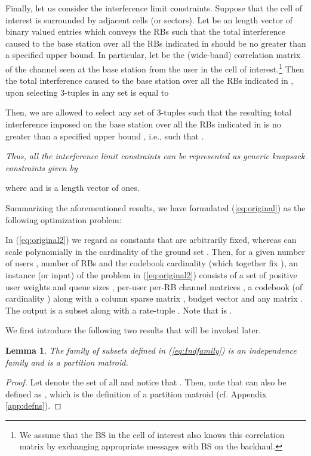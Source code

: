 \documentclass[11pt] {article}
\newtheorem{lemma}{Lemma}
\begin{document}
 Finally, let us consider the interference limit constraints. Suppose that the cell of interest is surrounded by  adjacent cells (or sectors). Let  be an length vector of binary valued entries which conveys the RBs such that the total interference caused to the  base station over all the RBs indicated in  should be no greater than a specified upper bound. In particular,
  let  be the (wide-band) correlation matrix of the channel seen at the  base station from the  user in the cell of interest.\footnote{We assume that the BS in the cell of interest also knows this correlation matrix by exchanging appropriate messages with BS  on the backhaul.} Then the total interference caused to the  base station over all the RBs indicated in , upon selecting 3-tuples in any set  is equal to
   
  Then, we are allowed to select   any set of 3-tuples  such that the resulting total interference imposed on the  base station over all the RBs indicated in  is
  no greater than a specified upper bound , i.e., such that .
{\em Thus, all the interference limit constraints can be represented as  generic knapsack constraints
 given by
 
 where  and  is a  length vector of ones.}










Summarizing the aforementioned results, we have formulated (\ref{eq:original})  as the following optimization problem:
 

 In (\ref{eq:original2}) we regard  as constants that are arbitrarily fixed, whereas  can scale polynomially in the cardinality of the ground set . Then, for a given number of users , number of RBs  and the codebook cardinality  (which together fix ), an instance
(or input) of the problem in  (\ref{eq:original2}) consists of a set of positive user weights  and queue sizes ,  per-user per-RB channel matrices , a codebook  (of cardinality ) along with a column sparse matrix , budget vector  and any matrix .
The output is a subset  along with a rate-tuple .
Note that   is .

We first introduce the following two results that will be invoked later.
\begin{lemma}\label{lem:Lem1}
The family of subsets  defined in (\ref{eq:Indfamily}) is an independence  family and    is a partition matroid.
\end{lemma}
\begin{proof} Let  denote the set of all  and notice that . Then, note that  can also be defined as , which is the definition of a partition matroid (cf. Appendix \ref{app:defns}).
\end{proof}
\end{document}
